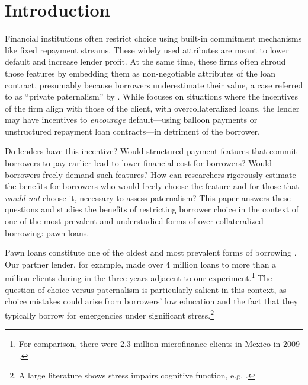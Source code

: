 \documentclass[12pt, a4paper]{article}
\begin{document}

\newpage

\section{Introduction}

Financial institutions often restrict choice using built-in commitment mechanisms like fixed repayment streams. These widely used attributes are meant to lower default and increase lender profit. At the same time, these firms often shroud those features by embedding them as non-negotiable attributes of the loan contract, presumably because borrowers underestimate their value, a case referred to as ``private paternalism'' by \cite{Laibson2018}. While \cite{Laibson2018} focuses on situations where the incentives of the firm align with those of the client, with overcollateralized loans, the lender may have incentives to \textit{encourage} default---using balloon payments or unstructured repayment loan contracts---in detriment of the borrower. 

Do lenders have this incentive? Would structured payment features that commit borrowers to pay earlier lead to lower financial cost for borrowers?  Would borrowers freely demand such features? How can researchers rigorously estimate the benefits for borrowers who would freely choose the feature and for those that \textit{would not} choose it, necessary to assess paternalism? This paper answers these questions and studies the benefits of restricting borrower choice  in the context of one of the most prevalent and understudied forms of over-collateralized borrowing: pawn loans. 

Pawn loans constitute one of the oldest and most prevalent forms of borrowing \citep{carter2012pawnshops}.
Our partner lender, for example, made over 4 million loans to more than a million clients during in the three years adjacent to our experiment.\footnote{For comparison, there were 2.3 million microfinance clients in Mexico in 2009 \citep{Pedroza:2010}.} 
The question of choice versus paternalism is particularly salient in this context, as choice mistakes could arise from borrowers' low education and the fact that they typically borrow for emergencies under significant stress.\footnote{A large literature shows  stress impairs cognitive function, e.g. \cite{StressReview}.}
\end{document}
